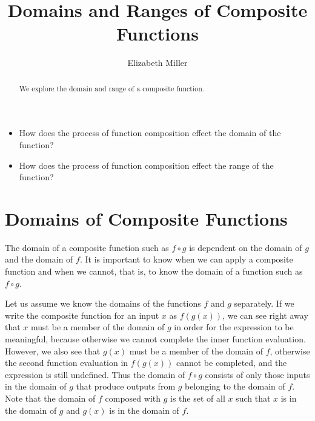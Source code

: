 \documentclass{ximera}
\author{Elizabeth Miller}
\title{Domains and Ranges of Composite Functions}
\begin{document}
\licenseOS
\begin{abstract}
   We explore the domain and range of a composite function.
\end{abstract}
\maketitle



\begin{motivatingQuestions}\begin{itemize}
\item How does the process of function composition effect the domain of the function?
\item How does the process of function composition effect the range of the function?
\end{itemize}\end{motivatingQuestions}



\section{Domains of Composite Functions}
The domain of a composite function such as $f \circ g$ is dependent on the domain of $g$ and the domain of $f$. It is important to know when we can apply a composite function and when we cannot, that is, to know the domain of a function such as $f  \circ g$. 

Let us assume we know the domains of the functions $f$ and $g$ separately. If we write the composite function for an input $x$ as $f(g(x))$, we can see right away that $x$ must be a member of the domain of $g$ in order for the expression to be meaningful, because otherwise we cannot complete the inner function evaluation. However, we also see that $g(x)$ must be a member of the domain of $f$, otherwise the second function evaluation in $f(g(x))$ cannot be completed, and the expression is still undefined. Thus the domain of $f \circ g$ consists of only those inputs in the domain of $g$ that produce outputs from $g$ belonging to the domain of $f$. Note that the domain of $f$ composed with $g$ is the set of all $x$ such that $x$ is in the domain of $g$ and $g(x)$ is in the domain of $f$.
\end{document}
